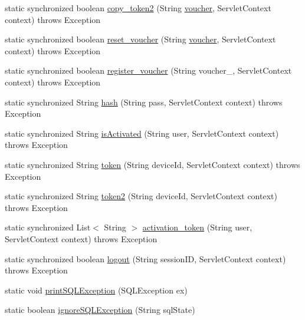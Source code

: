 \begin{DoxyCompactItemize}
\item 
static synchronized boolean \hyperlink{classcom_1_1dalogin_1_1_s_q_l_access_ae784394432104d42f855a9ee1e8be8ee}{copy\+\_\+token2} (String \hyperlink{classcom_1_1dalogin_1_1_s_q_l_access_ace6682e8e095aa1d589a181c3ec37cb0}{voucher}, Servlet\+Context context)  throws Exception 
\item 
static synchronized boolean \hyperlink{classcom_1_1dalogin_1_1_s_q_l_access_ac4363153109eee19fab9866da32a6506}{reset\+\_\+voucher} (String \hyperlink{classcom_1_1dalogin_1_1_s_q_l_access_ace6682e8e095aa1d589a181c3ec37cb0}{voucher}, Servlet\+Context context)  throws Exception 
\item 
static synchronized boolean \hyperlink{classcom_1_1dalogin_1_1_s_q_l_access_a4d094b31a83bdfb9628975fc81c2f7da}{register\+\_\+voucher} (String voucher\+\_\+, Servlet\+Context context)  throws Exception 
\item 
static synchronized String \hyperlink{classcom_1_1dalogin_1_1_s_q_l_access_a4c5ad585b42f9e6268720993d790e9f9}{hash} (String pass, Servlet\+Context context)  throws Exception 
\item 
static synchronized String \hyperlink{classcom_1_1dalogin_1_1_s_q_l_access_a1c2a8450e2e4f051017b6b42a7de1b87}{is\+Activated} (String user, Servlet\+Context context)  throws Exception 
\item 
static synchronized String \hyperlink{classcom_1_1dalogin_1_1_s_q_l_access_a99e9cb8ca2d123adec597e0b4cd063f7}{token} (String device\+Id, Servlet\+Context context)  throws Exception 
\item 
static synchronized String \hyperlink{classcom_1_1dalogin_1_1_s_q_l_access_aefba2c4140aa1a1f287c44aaedcad345}{token2} (String device\+Id, Servlet\+Context context)  throws Exception 
\item 
static synchronized List$<$ String $>$ \hyperlink{classcom_1_1dalogin_1_1_s_q_l_access_a6b6e51a792e4ba4e57a625f04f277db4}{activation\+\_\+token} (String user, Servlet\+Context context)  throws Exception 
\item 
static synchronized boolean \hyperlink{classcom_1_1dalogin_1_1_s_q_l_access_ac5350ae5f221b5ea02852f6c59fd7124}{logout} (String session\+ID, Servlet\+Context context)  throws Exception 
\item 
static void \hyperlink{classcom_1_1dalogin_1_1_s_q_l_access_af8b3800dccdc19311562efdb7bc1564d}{print\+S\+Q\+L\+Exception} (S\+Q\+L\+Exception ex)
\item 
static boolean \hyperlink{classcom_1_1dalogin_1_1_s_q_l_access_a294bf0428542df2a5015774d5b3a8585}{ignore\+S\+Q\+L\+Exception} (String sql\+State)
\end{DoxyCompactItemize}
